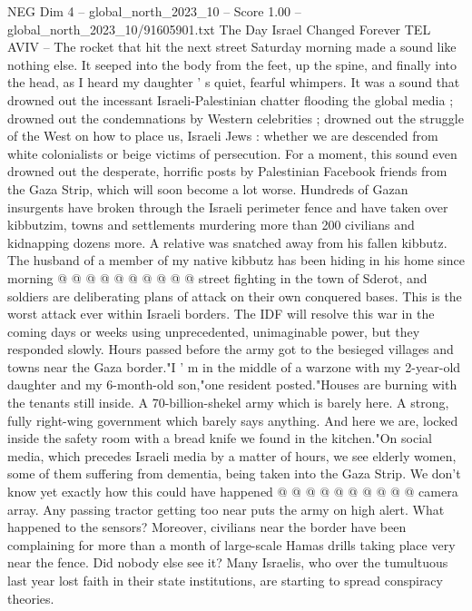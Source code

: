 \begin{textsample}{NEG Dim 4 – global\_north\_2023\_10 – Score 1.00 – global\_north\_2023\_10/91605901.txt}  \label{ex:f4_neg_005}
The Day Israel Changed Forever TEL AVIV -- The rocket that hit the next street Saturday morning made a sound like nothing else.
It seeped into the body from the feet, up the spine, and finally into the head, as I heard my daughter ' s quiet, fearful whimpers.
It was a sound that drowned out the incessant Israeli-Palestinian chatter flooding the global media ; drowned out the condemnations by Western celebrities ; drowned out the struggle of the West on how to place us, Israeli Jews : whether we are descended from white colonialists or beige victims of persecution.
For a moment, this sound even drowned out the desperate, horrific posts by Palestinian Facebook friends from the Gaza Strip, which will soon become a lot worse.
Hundreds of Gazan insurgents have broken through the Israeli perimeter fence and have taken over kibbutzim, towns and settlements murdering more than 200 civilians and kidnapping dozens more.
A relative was snatched away from his fallen kibbutz.
The husband of a member of my native kibbutz has been hiding in his home since morning @ @ @ @ @ @ @ @ @ @ street fighting in the town of Sderot, and soldiers are deliberating plans of attack on their own conquered bases.
This is the worst attack ever within Israeli borders.
The IDF will resolve this war in the coming days or weeks using unprecedented, unimaginable power, but they responded slowly.
Hours passed before the army got to the besieged villages and towns near the Gaza border."I ' m in the middle of a warzone with my 2-year-old daughter and my 6-month-old son,"one resident posted."Houses are burning with the tenants still inside.
A 70-billion-shekel army which is barely here.
A strong, fully right-wing government which barely says anything.
And here we are, locked inside the safety room with a bread knife we found in the kitchen."On social media, which precedes Israeli media by a matter of hours, we see elderly women, some of them suffering from dementia, being taken into the Gaza Strip.
We don't know yet exactly how this could have happened @ @ @ @ @ @ @ @ @ @ camera array.
Any passing tractor getting too near puts the army on high alert.
What happened to the sensors?
Moreover, civilians near the border have been complaining for more than a month of large-scale Hamas drills taking place very near the fence.
Did nobody else see it?
Many Israelis, who over the tumultuous last year lost faith in their state institutions, are starting to spread conspiracy theories.

\end{textsample}
